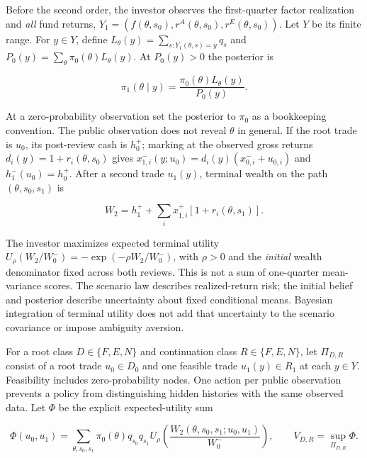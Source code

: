 \documentclass[11pt]{article}
\begin{document}
Before the second order, the investor observes the first-quarter
factor realization and \emph{all} fund returns,
\(Y_1=(f(\theta,s_0),r^A(\theta,s_0),r^E(\theta,s_0))\).
Let \(Y\) be its finite range. For \(y\in Y\), define
\(L_\theta(y)=\sum_{s:Y_1(\theta,s)=y}q_s\) and
\(P_0(y)=\sum_\theta\pi_0(\theta)L_\theta(y)\).
At \(P_0(y)>0\) the posterior is

\begin{equation*}
\pi_1(\theta\mid y)
 =\frac{\pi_0(\theta)L_\theta(y)}{P_0(y)}.
\end{equation*}

At a zero-probability observation set the posterior to \(\pi_0\)
as a bookkeeping convention. The public observation does not
reveal \(\theta\) in general. If the root trade is \(u_0\), its
post-review cash is \(h_0^+\); marking at the observed gross
returns \(d_i(y)=1+r_i(\theta,s_0)\) gives
\(x_{1,i}^-(y;u_0)=d_i(y)(x_{0,i}^-+u_{0,i})\) and
\(h_1^-(u_0)=h_0^+\). After a second trade \(u_1(y)\),
terminal wealth on the path \((\theta,s_0,s_1)\) is

\begin{equation*}
W_2=h_1^+ +\sum_i x_{1,i}^+
               [1+r_i(\theta,s_1)].
\end{equation*}

The investor maximizes expected terminal utility
\(U_\rho(W_2/W_0^-)=-\exp(-\rho W_2/W_0^-)\), with
\(\rho>0\) and the \emph{initial} wealth denominator fixed across
both reviews. This is not a sum of one-quarter mean-variance
scores. The scenario law describes realized-return risk; the
initial belief and posterior describe uncertainty about fixed
conditional means. Bayesian integration of terminal utility
does not add that uncertainty to the scenario covariance or
impose ambiguity aversion.

For a root class \(D\in\{F,E,N\}\) and continuation class
\(R\in\{F,E,N\}\), let \(\Pi_{D,R}\) consist of a root trade
\(u_0\in D_0\) and one feasible trade \(u_1(y)\in R_1\) at
each \(y\in Y\). Feasibility includes zero-probability nodes.
One action per public observation prevents a policy from
distinguishing hidden histories with the same observed data.
Let \(\Phi\) be the explicit expected-utility sum

\begin{equation*}
\Phi(u_0,u_1)
 =\sum_{\theta,s_0,s_1}\pi_0(\theta)q_{s_0}q_{s_1}
   U_\rho\!\left(\frac{W_2(\theta,s_0,s_1;u_0,u_1)}
                       {W_0^-}\right),
\qquad
V_{D,R}=\sup_{\Pi_{D,R}}\Phi .
\end{equation*}
\end{document}

